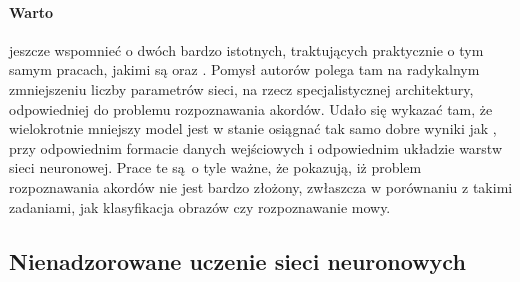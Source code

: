 \paragraph{Warto} jeszcze wspomnieć o dwóch bardzo istotnych, traktujących praktycznie o tym samym pracach, jakimi są \cite{hanlon_fifthnet_2020} oraz \cite{ohanlon_fifthnet_2021}. Pomysł autorów polega tam na radykalnym zmniejszeniu liczby parametrów sieci, na rzecz specjalistycznej architektury, odpowiedniej do problemu rozpoznawania akordów. Udało się wykazać tam, że wielokrotnie mniejszy model jest w stanie osiągnać tak samo dobre wyniki jak \cite{korzeniowski_fully_2016}, przy odpowiednim formacie danych wejściowych i odpowiednim układzie warstw sieci neuronowej. Prace te są o tyle ważne, że pokazują, iż problem rozpoznawania akordów nie jest bardzo złożony, zwłaszcza w porównaniu z takimi zadaniami, jak klasyfikacja obrazów czy rozpoznawanie mowy.

\subsection{Nienadzorowane uczenie sieci neuronowych}


